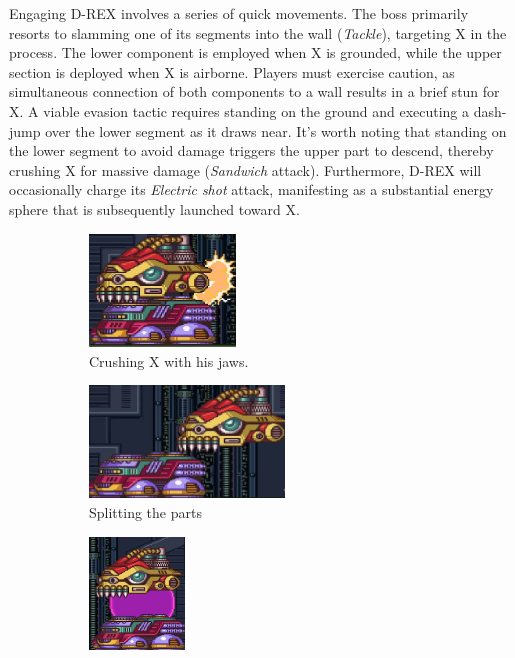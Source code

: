Engaging D-REX involves a series of quick movements. The boss primarily resorts to slamming one of its segments into the wall (\emph{Tackle}), targeting X in the process. The lower component is employed when X is grounded, while the upper section is deployed when X is airborne. Players must exercise caution, as simultaneous connection of both components to a wall results in a brief stun for X. A viable evasion tactic requires standing on the ground and executing a dash-jump over the lower segment as it draws near. It's worth noting that standing on the lower segment to avoid damage triggers the upper part to descend, thereby crushing X for massive damage (\emph{Sandwich} attack). Furthermore, D-REX will occasionally charge its \emph{Electric shot} attack, manifesting as a substantial energy sphere that is subsequently launched toward X. 
\begin{figure}[htp]
	\centering
	\begin{subfigure}[t]{0.40\linewidth}
		\centering
		\includegraphics[height=3cm]{figures/X1/Sigma_stages/Drex_crush.jpg}
		\caption{Crushing X with his jaws.}
	\end{subfigure}
	\begin{subfigure}[t]{0.45\linewidth}
		\centering
		\includegraphics[height=3cm]{figures/X1/Sigma_stages/Drex_press.jpg}
		\caption{Splitting the parts}
	\end{subfigure}
	\begin{subfigure}{\linewidth}
		\centering
		\includegraphics[height=3cm]{figures/X1/Sigma_stages/Drex_laser_1.jpg}

\end{subfigure}
\end{figure}
